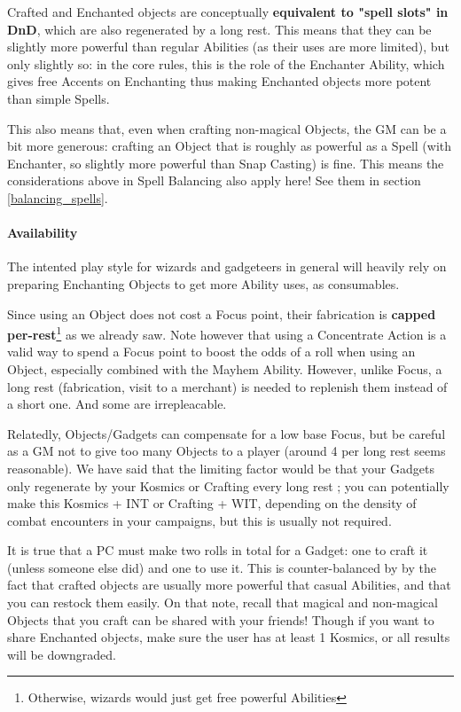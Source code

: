 \label{balancing_crafting}

Crafted and Enchanted objects are conceptually \textbf{equivalent to "spell slots" in DnD}, which are also regenerated by a long rest. This means that they can be slightly more powerful than regular Abilities (as their uses are more limited), but only slightly so: in the core rules, this is the role of the Enchanter Ability, which gives free Accents on Enchanting thus making Enchanted objects more potent than simple Spells.

This also means that, even when crafting non-magical Objects, the GM can be a bit more generous: crafting an Object that is roughly as powerful as a Spell (with Enchanter, so slightly more powerful than Snap Casting) is fine. This means the considerations above in Spell Balancing also apply here! See them in section \ref{balancing_spells}.


\paragraph{Availability}

The intented play style for wizards and gadgeteers in general will heavily rely on preparing Enchanting Objects to get more Ability uses, as consumables.

Since using an Object does not cost a Focus point, their fabrication is \textbf{capped per-rest}\footnote{Otherwise, wizards would just get free powerful Abilities} as we already saw. Note however that using a Concentrate Action is a valid way to spend a Focus point to boost the odds of a roll when using an Object, especially combined with the Mayhem Ability. However, unlike Focus, a long rest (fabrication, visit to a merchant) is needed to replenish them instead of a short one. And some are irrepleacable.

Relatedly, Objects/Gadgets can compensate for a low base Focus, but be careful as a GM not to give too many Objects to a player (around 4 per long rest seems reasonable). We have said that the limiting factor would be that your Gadgets only regenerate by your Kosmics or Crafting every long rest ; you can potentially make this Kosmics + INT or Crafting + WIT, depending on the density of combat encounters in your campaigns, but this is usually not required.

It is true that a PC must make two rolls in total for a Gadget: one to craft it (unless someone else did) and one to use it. This is counter-balanced by by the fact that crafted objects are usually more powerful that casual Abilities, and that you can restock them easily. On that note, recall that magical and non-magical Objects that you craft can be shared with your friends! Though if you want to share Enchanted objects, make sure the user has at least 1 Kosmics, or all results will be downgraded.


